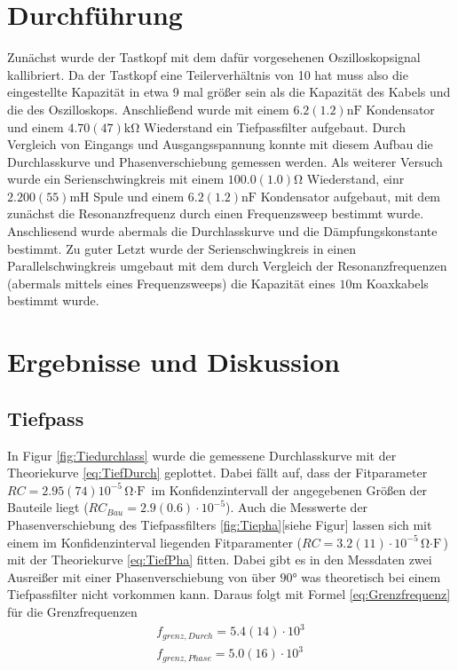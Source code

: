 \documentclass[11pt, a4paper]{article}
\begin{document}
    




    \section{Durchführung}
    Zunächst wurde der Tastkopf mit dem dafür vorgesehenen Oszilloskopsignal kallibriert. Da der Tastkopf eine Teilerverhältnis von 10 hat muss also die
    eingestellte Kapazität in etwa 9 mal größer sein als die Kapazität des Kabels und die des Oszilloskops. 
    Anschließend wurde mit einem $6.2(1.2) \si{\nano\farad}$ Kondensator und einem $4.70(47) \si{\kilo\ohm}$ Wiederstand ein Tiefpassfilter aufgebaut. 
    Durch Vergleich von Eingangs und Ausgangsspannung konnte mit diesem Aufbau die Durchlasskurve und Phasenverschiebung gemessen werden.
    Als weiterer Versuch wurde ein Serienschwingkreis mit einem $100.0(1.0) \si{\ohm}$ Wiederstand, einr $2.200(55) \si{\milli\henry}$ Spule und einem $6.2(1.2) \si{\nano\farad}$ Kondensator aufgebaut, mit dem zunächst die Resonanzfrequenz durch einen Frequenzsweep bestimmt wurde.
    Anschliesend wurde abermals die Durchlasskurve und die Dämpfungskonstante bestimmt.
    Zu guter Letzt wurde der Serienschwingkreis in einen Parallelschwingkreis umgebaut mit dem durch Vergleich der Resonanzfrequenzen (abermals mittels eines Frequenzsweeps) die Kapazität eines $10 \si{\metre}$ Koaxkabels bestimmt wurde.

    \section{Ergebnisse und Diskussion}
    \subsection{Tiefpass}
    In Figur \ref{fig:Tiedurchlass} wurde die gemessene Durchlasskurve mit der Theoriekurve \ref{eq:TiefDurch} geplottet. 
    Dabei fällt auf, dass der Fitparameter $RC = 2.95(74) 10^{-5} \si{\ohm\cdot\farad}$ im Konfidenzintervall der angegebenen Größen der Bauteile liegt ($RC_{Bau} = 2.9(0.6)\cdot 10^{-5}$).
    Auch die Messwerte der Phasenverschiebung des Tiefpassfilters \ref{fig:Tiepha}[siehe Figur] lassen sich mit einem im Konfidenzinterval liegenden Fitparamenter ($RC = 3.2(11) \cdot 10^{-5} \si{\ohm\cdot\farad}$) mit der Theoriekurve \ref{eq:TiefPha} fitten.
    Dabei gibt es in den Messdaten zwei Ausreißer mit einer Phasenverschiebung von über $90$° was theoretisch bei einem Tiefpassfilter nicht vorkommen kann.
    Daraus folgt mit Formel \ref{eq:Grenzfrequenz} für die Grenzfrequenzen
    \begin{align}
        f_{grenz,Durch} = 5.4(14) \cdot 10^{3} \\
        f_{grenz,Phase} = 5.0(16) \cdot 10^{3}
    \end{align}
\end{document}
